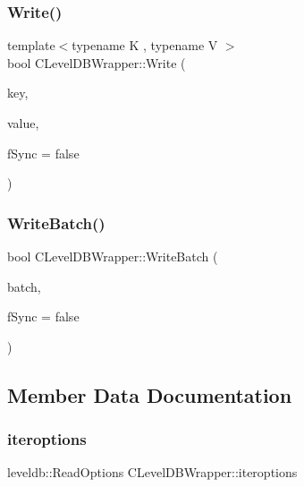 \subsubsection{\texorpdfstring{Write()}{Write()}}
{\footnotesize\ttfamily template$<$typename K , typename V $>$ \\
bool C\+Level\+D\+B\+Wrapper\+::\+Write (\begin{DoxyParamCaption}\item[{const K \&}]{key,  }\item[{const V \&}]{value,  }\item[{bool}]{f\+Sync = {\ttfamily false} }\end{DoxyParamCaption})\hspace{0.3cm}{\ttfamily [inline]}}

\mbox{\label{class_c_level_d_b_wrapper_a820484c9e427f9e3400396e750acf4b8}} 
\subsubsection{\texorpdfstring{Write\+Batch()}{WriteBatch()}}
{\footnotesize\ttfamily bool C\+Level\+D\+B\+Wrapper\+::\+Write\+Batch (\begin{DoxyParamCaption}\item[{\mbox{\hyperlink{class_c_level_d_b_batch}{C\+Level\+D\+B\+Batch}} \&}]{batch,  }\item[{bool}]{f\+Sync = {\ttfamily false} }\end{DoxyParamCaption})}



\subsection{Member Data Documentation}
\mbox{\label{class_c_level_d_b_wrapper_a284f69f5c017c0537d51ba373291f195}} 
\subsubsection{\texorpdfstring{iteroptions}{iteroptions}}
{\footnotesize\ttfamily leveldb\+::\+Read\+Options C\+Level\+D\+B\+Wrapper\+::iteroptions\hspace{0.3cm}{\ttfamily [private]}}



